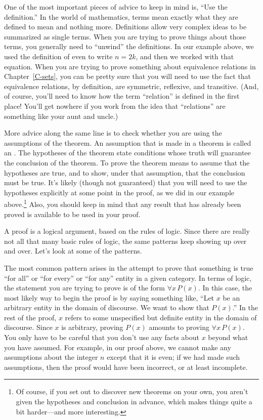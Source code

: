 One of the most important pieces of advice to keep in mind is,
``Use the definition.''  In the world of mathematics, terms
mean exactly what they are defined to mean and nothing more.
Definitions allow very complex ideas to be summarized as
single terms.  When you are trying to prove things about
those terms, you generally need to ``unwind'' the definitions.
In our example above, we used the definition of
even to write $n=2k$, and then we worked with that equation.
When you are trying to prove something about equivalence relations
in Chapter~\ref{C-sets},
you can be pretty sure that you will need to use the
fact that equivalence relations, by definition, are symmetric, reflexive,
and transitive.  (And, of course,
you'll need to know how the term ``relation'' is defined
in the first place!
You'll get nowhere if you work from the idea that ``relations'' are something
like your aunt and uncle.)

More advice along the same line is to check whether you are
using the assumptions of the theorem.  An assumption that
is made in a theorem is called an .  The hypotheses
of the theorem state conditions whose truth will guarantee the
conclusion of the theorem.  To prove the theorem means to assume
that the hypotheses are true, and to show, under that assumption,
that the conclusion must be true.  It's likely (though not
guaranteed) that you will need to use the hypotheses explicitly 
at some point in the proof, as we did in our example above.\footnote{Of 
course, if you set out to
discover new theorems on your own, you aren't given the hypotheses
and conclusion in advance, which makes things quite a bit harder---and
more interesting.}  Also, you should keep in mind that any
result that has already been proved is available to be used
in your proof.

\medbreak

A proof is a logical argument, based on the rules of logic.
Since there are really not all that many basic rules of logic,
the same patterns keep showing up over and over.  Let's look
at some of the patterns.

The most common pattern arises in the attempt to prove that
something is true ``for all'' or ``for every'' or ``for any''
entity in a given category.  In terms of logic, the statement
you are trying to prove is of the form $\forall x\,P(x)$.
In this case, the most likely way to begin the proof is
by saying something like, ``Let $x$ be an arbitrary entity in 
the domain of discourse.  We want to show that $P(x)$.''  In the
rest of the proof, $x$ refers to some unspecified but definite
entity in the domain of discourse.  Since $x$ is arbitrary,
proving $P(x)$ amounts to proving $\forall x\,P(x)$.  You only
have to be careful that you don't use any facts about $x$ beyond
what you have assumed.  For example, in our proof above, we cannot
make any assumptions about the integer $n$ except that it is
even; if we had made such assumptions, then the proof would have
been incorrect, or at least incomplete.

